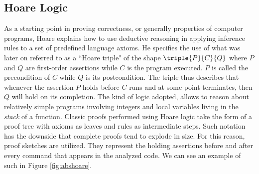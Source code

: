 \tocless\subsection{Hoare Logic}

As a starting point in proving correctness, or generally properties of computer programs, Hoare \cite{hoare} explains how to use deductive reasoning in applying inference rules to a set of predefined language axioms. He specifies the use of what was later on referred to as a ``Hoare triple" of the shape $\triple{P}{C}{Q}$ where $P$ and $Q$ are first-order assertions while $C$ is the program executed. $P$ is called the precondition of $C$ while $Q$ is its postcondition. The triple thus describes that whenever the assertion $P$ holds before $C$ runs and at some point terminates, then $Q$ will hold on its completion. The kind of logic adopted, allows to reason about relatively simple programs involving integers and local variables living in the \textit{stack} of a function. Classic proofs performed using Hoare logic take the form of a proof tree with axioms as leaves and rules as intermediate steps. Such notation has the downside that complete proofs tend to explode in size. For this reason, proof sketches are utilized. They represent the holding assertions before and after every command that appears in the analyzed code. We can see an example of such in Figure \ref{fig:abshoare}.
